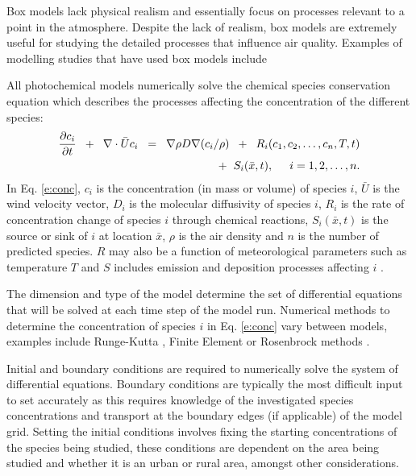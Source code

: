 Box models lack physical realism and essentially focus on processes relevant to a point in the atmosphere.
Despite the lack of realism, box models are extremely useful for studying the detailed processes that influence air quality.
Examples of modelling studies that have used box models include 

All photochemical models numerically solve the chemical species conservation equation which describes the processes affecting the concentration of the different species:
\begin{equation} \label{e:conc}
    \begin{split}
        \frac{\partial c_i}{\partial t} \hspace{2mm} + \hspace{2mm} \nabla \cdot \bar{U}c_i \hspace{2mm} = \hspace{2mm} \nabla \rho D \nabla(c_i/\rho) \hspace{2mm} + \hspace{2mm} R_i(c_1, c_2, \dots, c_n, T, t) \\ + \hspace{2mm} S_i(\bar{x}, t), \hspace{5mm} i = 1, 2, \dots, n.
    \end{split}
\end{equation}
In Eq. \eqref{e:conc}, $c_i$ is the concentration (in mass or volume) of species $i$, $\bar{U}$ is the wind velocity vector, $D_i$ is the molecular diffusivity of species $i$, $R_i$ is the rate of concentration change of species $i$ through chemical reactions, $S_i(\bar{x}, t)$ is the source or sink of $i$ at location $\bar{x}$, $\rho$ is the air density and $n$ is the number of predicted species.
$R$ may also be a function of meteorological parameters such as temperature $T$ and $S$ includes emission and deposition processes affecting $i$ \citep{Russell:2000}.

The dimension and type of the model determine the set of differential equations that will be solved at each time step of the model run. 
Numerical methods to determine the concentration of species $i$ in Eq. \eqref{e:conc} vary between models, examples include Runge-Kutta \citep{Sandu:1997b}, Finite Element \citep{Russell:2000} or Rosenbrock methods \citep{Sandu:1997a}.

Initial and boundary conditions are required to numerically solve the system of differential equations.
Boundary conditions are typically the most difficult input to set accurately as this requires knowledge of the investigated species concentrations and transport at the boundary edges (if applicable) of the model grid.  
Setting the initial conditions involves fixing the starting concentrations of the species being studied, these conditions are dependent on the area being studied and whether it is an urban or rural area, amongst other considerations. 

